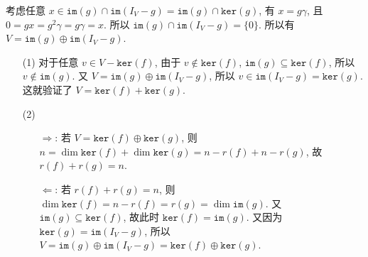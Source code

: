 \documentclass{article}
\begin{document}
\begin{itemize}
    考虑任意 $x\in \mathtt{im}(g) \cap\mathtt{im}(I_V - g) = \mathtt{im}(g) \cap\mathtt{ker}(g)$, 有 $x = g\gamma$, 且 $0 = gx = g^2\gamma = g\gamma = x$. 所以 $\mathtt{im}(g)\cap\mathtt{im}(I_V - g) = \{0\}$. 所以有 $V = \mathtt{im}(g) \oplus \mathtt{im}(I_V-g)$.
    \begin{itemize}
        \item [(1)] 对于任意 $v\in V - \mathtt{ker}(f)$, 由于 $v\notin \mathtt{ker}(f)$, $\mathtt{im}(g)\subseteq \mathtt{ker}(f)$, 所以 $v\notin \mathtt{im}(g)$. 又 $V = \mathtt{im}(g) \oplus \mathtt{im}(I_V - g)$, 所以 $v\in \mathtt{im}(I_V - g) = \mathtt{ker}(g)$. 这就验证了 $V = \mathtt{ker}(f) + \mathtt{ker}(g)$.
        
        \item [(2)] 
        \begin{itemize}
            \item [$\Rightarrow$:] 若 $V = \mathtt{ker}(f) \oplus \mathtt{ker}(g)$, 则 $n = \dim\mathtt{ker}(f) + \dim \mathtt{ker}(g) = n-r(f) + n - r(g)$, 故 $r(f) + r(g) = n$.
            \item [$\Leftarrow$:] 若 $r(f) + r(g) = n$, 则 $\dim\mathtt{ker}(f) = n - r(f) = r(g) = \dim\mathtt{im}(g)$. 又 $\mathtt{im}(g)\subseteq \mathtt{ker}(f)$, 故此时 $\mathtt{ker}(f) = \mathtt{im}(g)$. 又因为 $\mathtt{ker}(g) = \mathtt{im}(I_V - g)$, 所以 $V = \mathtt{im}(g) \oplus \mathtt{im}(I_V - g) = \mathtt{ker}(f) \oplus \mathtt{ker}(g)$.
        \end{itemize}
        
    \end{itemize}
   

\end{itemize}
\end{document}

